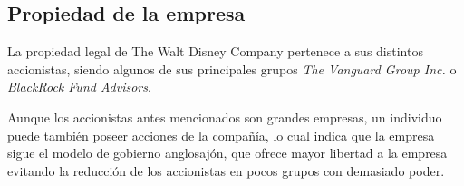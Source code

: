 \subsection{Propiedad de la empresa}
La propiedad legal de The Walt Disney Company pertenece a sus distintos accionistas, siendo algunos de sus principales grupos \textit{The Vanguard Group Inc.} o \textit{BlackRock Fund Advisors}.

Aunque los accionistas antes mencionados son grandes empresas, un individuo puede también poseer acciones de la compañía, lo cual indica que la empresa sigue el modelo de gobierno anglosajón, que ofrece mayor libertad a la empresa evitando la reducción de los accionistas en pocos grupos con demasiado poder.